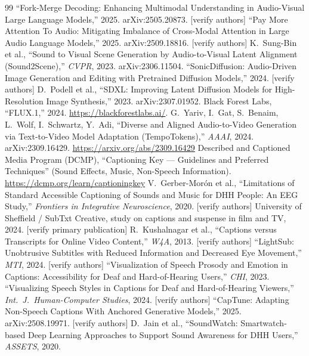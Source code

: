\documentclass[11pt,a4paper]{article}
\begin{document}
\begin{thebibliography}{99}
 ``Fork-Merge Decoding: Enhancing Multimodal Understanding in Audio-Visual Large Language Models,'' 2025. arXiv:2505.20873. [verify authors]
 ``Pay More Attention To Audio: Mitigating Imbalance of Cross-Modal Attention in Large Audio Language Models,'' 2025. arXiv:2509.18816. [verify authors]
 K.\ Sung-Bin et al., ``Sound to Visual Scene Generation by Audio-to-Visual Latent Alignment (Sound2Scene),'' \emph{CVPR}, 2023. arXiv:2306.11504.
 ``SonicDiffusion: Audio-Driven Image Generation and Editing with Pretrained Diffusion Models,'' 2024. [verify authors]
 D.\ Podell et al., ``SDXL: Improving Latent Diffusion Models for High-Resolution Image Synthesis,'' 2023. arXiv:2307.01952.
 Black Forest Labs, ``FLUX.1,'' 2024. \url{https://blackforestlabs.ai/}.
 G.\ Yariv, I.\ Gat, S.\ Benaim, L.\ Wolf, I.\ Schwartz, Y.\ Adi, ``Diverse and Aligned Audio-to-Video Generation via Text-to-Video Model Adaptation (TempoTokens),'' \emph{AAAI}, 2024. arXiv:2309.16429. \url{https://arxiv.org/abs/2309.16429}
 Described and Captioned Media Program (DCMP), ``Captioning Key --- Guidelines and Preferred Techniques'' (Sound Effects, Music, Non-Speech Information). \url{https://dcmp.org/learn/captioningkey}
 V.\ Gerber-Mor\'on et al., ``Limitations of Standard Accessible Captioning of Sounds and Music for DHH People: An EEG Study,'' \emph{Frontiers in Integrative Neuroscience}, 2020. [verify authors]
 University of Sheffield / SubTxt Creative, study on captions and suspense in film and TV, 2024. [verify primary publication]
 R.\ Kushalnagar et al., ``Captions versus Transcripts for Online Video Content,'' \emph{W4A}, 2013. [verify authors]
 ``LightSub: Unobtrusive Subtitles with Reduced Information and Decreased Eye Movement,'' \emph{MTI}, 2024. [verify authors]
 ``Visualization of Speech Prosody and Emotion in Captions: Accessibility for Deaf and Hard-of-Hearing Users,'' \emph{CHI}, 2023.
 ``Visualizing Speech Styles in Captions for Deaf and Hard-of-Hearing Viewers,'' \emph{Int.\ J.\ Human-Computer Studies}, 2024. [verify authors]
 ``CapTune: Adapting Non-Speech Captions With Anchored Generative Models,'' 2025. arXiv:2508.19971. [verify authors]
 D.\ Jain et al., ``SoundWatch: Smartwatch-based Deep Learning Approaches to Support Sound Awareness for DHH Users,'' \emph{ASSETS}, 2020.

\end{thebibliography}
\end{document}
